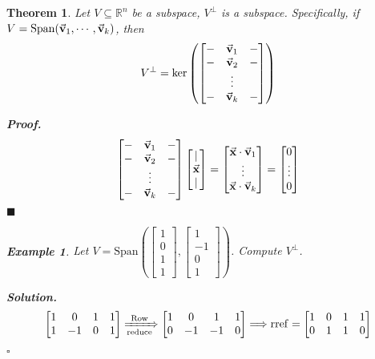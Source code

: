 \documentclass[12pt, a4paper]{article}
\newtheorem{thm}{Theorem}[subsection]
\newtheorem{eg}{Example}[subsection]
\newenvironment*{sol}{\par\indent\textbf{\textit{Solution. }}}{\hfill{$\square$}\par}
\newenvironment*{prf}{\par\indent\textbf{\textit{Proof. }}}{\hfill $\blacksquare$\par}
\def\R{{\mathbb{R}}}
\def\rref{\mathrm{rref}}
\def\Span{\mathrm{Span}}
\def\vecx{\va{x}}
\def\vecv{\va{v}}
\begin{document}
\begin{thm}
	Let $V\subseteq\R^n$ be a subspace, $V^\perp$ is a subspace. Specifically, if $V=\Span(\vecv_1,\cdots,\vecv_k)$, then \[V^\perp=\ker\left(\begin{bmatrix}-&\vecv_1&-\\-&\vecv_2&-\\&\vdots&\\-&\vecv_k&-\end{bmatrix}\right)\]
	\begin{prf}
		\[\begin{bmatrix}-&\vecv_1&-\\-&\vecv_2&-\\&\vdots&\\-&\vecv_k&-\end{bmatrix}\begin{bmatrix}|\\\vecx\\|\end{bmatrix}=\begin{bmatrix}\vecx\cdot\vecv_1\\\vdots\\\vecx\cdot\vecv_k\end{bmatrix}=\begin{bmatrix}0\\\vdots\\0\end{bmatrix}\]	
	\end{prf}
	\begin{eg}
		Let $V=\Span\left(\begin{bmatrix}1\\0\\1\\1\end{bmatrix},\begin{bmatrix}1\\-1\\0\\1\end{bmatrix}\right)$. Compute $V^\perp$.	
	\begin{sol}
		\[\begin{bmatrix}1&0	&1&1\\1&-1&0&1\end{bmatrix}\xRightarrow[\text{reduce}]{\text{Row}}\begin{bmatrix}1&0&1&1\\0&-1&-1&0\end{bmatrix}\Longrightarrow\rref=\begin{bmatrix}1&0&1&1\\0&1&1&0\end{bmatrix}\]

\end{sol}
\end{eg}
\end{thm}
\end{document}
